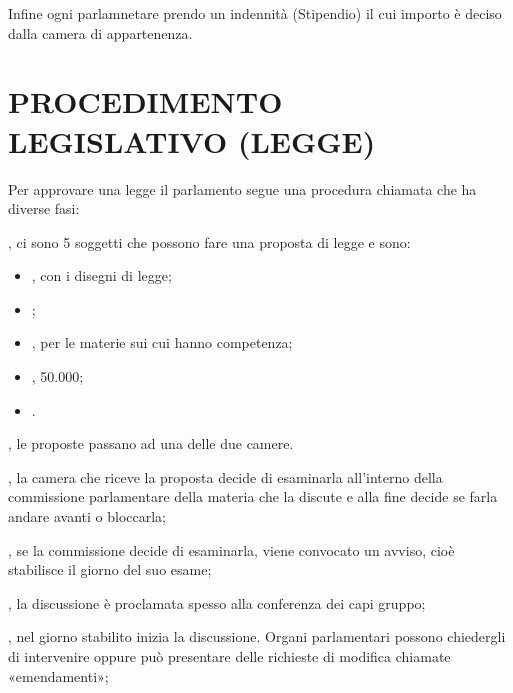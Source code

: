 \documentclass[letterpaper,10pt,italian]{sphinxmanual}
\begin{document}
\sphinxAtStartPar
Infine ogni parlamnetare prendo un indennità (Stipendio) il cui importo è deciso dalla camera di appartenenza.

\sphinxstepscope


\chapter{PROCEDIMENTO LEGISLATIVO (LEGGE)}
\label{\detokenize{PROCEDIMENTO LEGISLATIVO:procedimento-legislativo-legge}}\label{\detokenize{PROCEDIMENTO LEGISLATIVO::doc}}
\sphinxAtStartPar
Per approvare una legge il parlamento segue una procedura chiamata  che ha diverse fasi:

\sphinxAtStartPar
{}, ci sono 5 soggetti che possono fare una proposta di legge e sono:
\begin{itemize}
\item {} 
\sphinxAtStartPar
{}, con i disegni di legge;

\item {} 
\sphinxAtStartPar
{};

\item {} 
\sphinxAtStartPar
{}, per le materie sui cui hanno competenza;

\item {} 
\sphinxAtStartPar
{}, 50.000;

\item {} 
\sphinxAtStartPar
{}.

\end{itemize}

\sphinxAtStartPar
{}, le proposte passano ad una delle due camere.

\sphinxAtStartPar
{}, la camera che riceve la proposta decide di esaminarla all’interno della commissione parlamentare della materia che la discute e alla fine decide se farla andare avanti o bloccarla;

\sphinxAtStartPar
{}, se la commissione decide di esaminarla, viene convocato un avviso, cioè stabilisce il giorno del suo esame;

\sphinxAtStartPar
{}, la discussione è proclamata spesso alla conferenza dei capi gruppo;

\sphinxAtStartPar
{}, nel giorno stabilito inizia la discussione. Organi parlamentari possono chiedergli di intervenire oppure può presentare delle richieste di modifica chiamate «emendamenti»;
\end{document}
